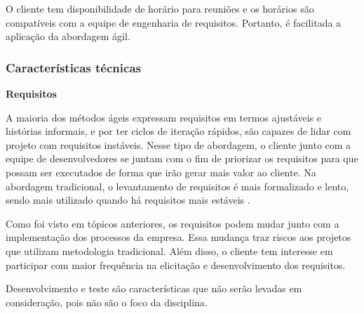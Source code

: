\begin{description}
O cliente tem disponibilidade de horário para reuniões e os horários são compatíveis com a equipe de engenharia de requisitos. Portanto, é facilitada a aplicação da abordagem ágil.

\end{description}

\subsubsection{Características técnicas}
\begin{description}
\item \textbf{Requisitos}

A maioria dos métodos ágeis expressam requisitos em termos ajustáveis e histórias informais, e por ter ciclos de iteração rápidos, são capazes de lidar com projeto com requisitos instáveis. Nesse tipo de abordagem, o cliente junto com a equipe de desenvolvedores se juntam com o fim de priorizar os requisitos para que possam ser executados de forma que irão gerar mais valor ao cliente. Na abordagem tradicional, o levantamento de requisitos é mais formalizado e lento, sendo mais utilizado quando há requisitos mais estáveis \cite{boehm2004}.

Como foi visto em tópicos anteriores, os requisitos podem mudar junto com a implementação dos processos da empresa. Essa mudança traz riscos aos projetos que utilizam metodologia tradicional. Além disso, o cliente tem interesse em participar com maior frequência na elicitação e desenvolvimento dos requisitos.

Desenvolvimento e teste são características que não serão levadas em consideração, pois não são o foco da disciplina.

\end{description}

